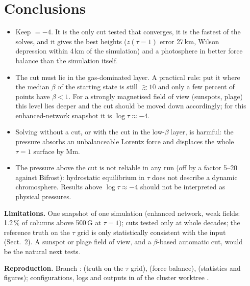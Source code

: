 \section{Conclusions}
\begin{itemize}
\item Keep  $=-4$. It is the only cut tested that converges, it is the fastest of the solves, and it gives
the best heights ($z(\tau{=}1)$ error 27\,km, Wilson depression within 4\,km of the simulation) and a photosphere in better force
balance than the simulation itself.
\item The cut must lie in the gas-dominated layer. A practical rule: put it where the median $\beta$ of the starting state is
still $\gtrsim10$ and only a few percent of points have $\beta<1$. For a strongly magnetised field of view (sunspots, plage)
this level lies deeper and the cut should be moved down accordingly; for this enhanced-network snapshot it is
$\log\tau\approx-4$.
\item Solving without a cut, or with the cut in the low-$\beta$ layer, is harmful: the pressure absorbs an unbalanceable
Lorentz force and displaces the whole $\tau=1$ surface by Mm.
\item The pressure above the cut is not reliable in any run (off by a factor 5--20 against Bifrost): hydrostatic equilibrium
in $\tau$ does not describe a dynamic chromosphere. Results above $\log\tau\approx-4$ should not be interpreted as physical
pressures.
\end{itemize}

\textbf{Limitations.} One snapshot of one simulation (enhanced network, weak fields: 1.2\,\% of columns above 500\,G at
$\tau=1$); cuts tested only at whole decades; the reference truth on the $\tau$ grid is only statistically consistent with
the input (Sect.~2). A sunspot or plage field of view, and a $\beta$-based automatic cut, would be the natural next tests.

\textbf{Reproduction.} Branch :  (truth on the $\tau$
grid),  (force balance),  (statistics and figures); configurations, logs and outputs in
 of the cluster worktree .

